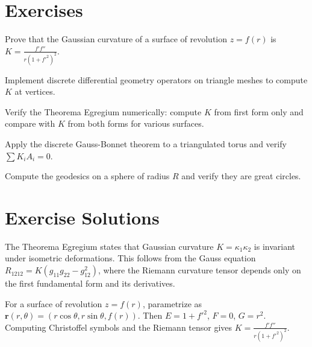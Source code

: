 \section{Exercises}

\begin{exercise}
Prove that the Gaussian curvature of a surface of revolution $z = f(r)$ is $K = \frac{f' f''}{r(1+f'^2)^2}$.
\end{exercise}

\begin{exercise}
Implement discrete differential geometry operators on triangle meshes to compute $K$ at vertices.
\end{exercise}

\begin{exercise}
Verify the Theorema Egregium numerically: compute $K$ from first form only and compare with $K$ from both forms for various surfaces.
\end{exercise}

\begin{exercise}
Apply the discrete Gauss-Bonnet theorem to a triangulated torus and verify $\sum K_i A_i = 0$.
\end{exercise}

\begin{exercise}
Compute the geodesics on a sphere of radius $R$ and verify they are great circles.
\end{exercise}



\section{Exercise Solutions}

\begin{solution}
The Theorema Egregium states that Gaussian curvature $K = \kappa_1 \kappa_2$ is invariant under isometric deformations. This follows from the Gauss equation $R_{1212} = K(g_{11}g_{22} - g_{12}^2)$, where the Riemann curvature tensor depends only on the first fundamental form and its derivatives.
\end{solution}

\begin{solution}
For a surface of revolution $z = f(r)$, parametrize as $\mathbf{r}(r,\theta) = (r\cos\theta, r\sin\theta, f(r))$. Then $E = 1 + f'^2$, $F = 0$, $G = r^2$. Computing Christoffel symbols and the Riemann tensor gives $K = \frac{f' f''}{r(1+f'^2)^2}$.
\end{solution}

